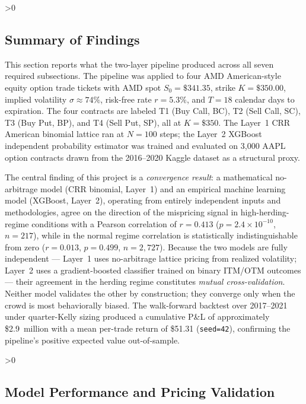 \documentclass[12pt, letterpaper]{article}
\let\oldsubsection\subsection
\renewcommand{\subsection}{%
  \ifnum\value{subsection}>0 \clearpage\fi
  \oldsubsection
}
\begin{document}
\subsection{Summary of Findings}

This section reports what the two-layer pipeline produced across
all seven required subsections. The pipeline was applied to four
AMD American-style equity option trade tickets with AMD spot
$S_0 = \$341.35$, strike $K = \$350.00$, implied volatility
$\sigma \approx 74\%$, risk-free rate $r = 5.3\%$, and $T = 18$
calendar days to expiration. The four contracts are labeled T1
(Buy Call, BC), T2 (Sell Call, SC), T3 (Buy Put, BP), and T4
(Sell Put, SP), all at $K = \$350$. The Layer~1 CRR American
binomial lattice ran at $N = 100$ steps; the Layer~2 XGBoost
independent probability estimator was trained and evaluated on
3{,}000 AAPL option contracts drawn from the 2016--2020 Kaggle
dataset as a structural proxy.

The central finding of this project is a \textit{convergence result}:
a mathematical no-arbitrage model (CRR binomial, Layer~1) and an
empirical machine learning model (XGBoost, Layer~2), operating from
entirely independent inputs and methodologies, agree on the
direction of the mispricing signal in high-herding-regime conditions
with a Pearson correlation of $r = 0.413$
($p = 2.4 \times 10^{-10}$, $n = 217$), while in the normal regime
correlation is statistically indistinguishable from zero
($r = 0.013$, $p = 0.499$, $n = 2{,}727$). Because the two models
are fully independent --- Layer~1 uses no-arbitrage lattice pricing
from realized volatility; Layer~2 uses a gradient-boosted classifier
trained on binary ITM/OTM outcomes --- their agreement in the
herding regime constitutes \textit{mutual cross-validation}. Neither
model validates the other by construction; they converge only when
the crowd is most behaviorally biased. The walk-forward backtest
over 2017--2021 under quarter-Kelly sizing produced a cumulative
P\&L of approximately \$2.9~million with a mean per-trade return of
\$51.31 (\texttt{seed=42}), confirming the pipeline's positive
expected value out-of-sample.

\subsection{Model Performance and Pricing Validation}
\end{document}
